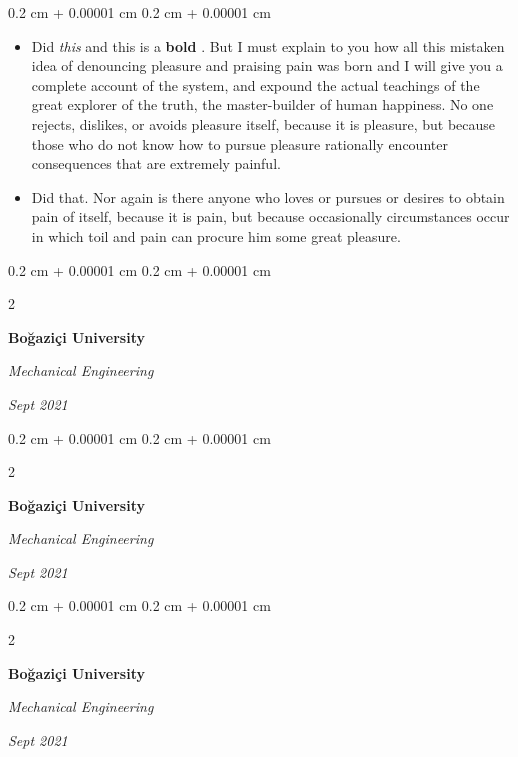 \documentclass[10pt, letterpaper]{article}
\newenvironment{highlights}{
    \begin{itemize}[
        topsep=0.10 cm,
        parsep=0.10 cm,
        partopsep=0pt,
        itemsep=0pt,
        leftmargin=0.4 cm + 10pt
    ]
}{
    \end{itemize}
} %
\newenvironment{onecolentry}{
    \begin{adjustwidth}{
        0.2 cm + 0.00001 cm
    }{
        0.2 cm + 0.00001 cm
    }
}{
    \end{adjustwidth}
} %
\newenvironment{twocolentry}[2][]{
    \onecolentry
    \def\secondColumn{#2}
    \setcolumnwidth{\fill, 4.5 cm}
    \begin{paracol}{2}
}{
    \switchcolumn \raggedleft \secondColumn
    \end{paracol}
    \endonecolentry
} %
\let\hrefWithoutArrow\href
\renewcommand{\href}[2]{\hrefWithoutArrow{#1}{\ifthenelse{\equal{#2}{}}{ }{#2 }\raisebox{.15ex}{\footnotesize \faExternalLink*}}}
\begin{document}
        \vspace{0.10 cm}
        \begin{onecolentry}
            \begin{highlights}
                \item Did \textit{this} and this is a \textbf{bold} \href{https://example.com}{link}. But I must explain to you how all this mistaken idea of denouncing pleasure and praising pain was born and I will give you a complete account of the system, and expound the actual teachings of the great explorer of the truth, the master-builder of human happiness. No one rejects, dislikes, or avoids pleasure itself, because it is pleasure, but because those who do not know how to pursue pleasure rationally encounter consequences that are extremely painful.
                \item Did that. Nor again is there anyone who loves or pursues or desires to obtain pain of itself, because it is pain, but because occasionally circumstances occur in which toil and pain can procure him some great pleasure.
            \end{highlights}
        \end{onecolentry}


        \vspace{0.2 cm}

        \begin{twocolentry}{
            
            
        \textit{Sept 2021}}
            \textbf{Boğaziçi University}

            \textit{Mechanical Engineering}
        \end{twocolentry}



        \vspace{0.2 cm}

        \begin{twocolentry}{
            
            
        \textit{Sept 2021}}
            \textbf{Boğaziçi University}

            \textit{Mechanical Engineering}
        \end{twocolentry}



        \vspace{0.2 cm}

        \begin{twocolentry}{
            
            
        \textit{Sept 2021}}
            \textbf{Boğaziçi University}

            \textit{Mechanical Engineering}
        \end{twocolentry}
\end{document}
